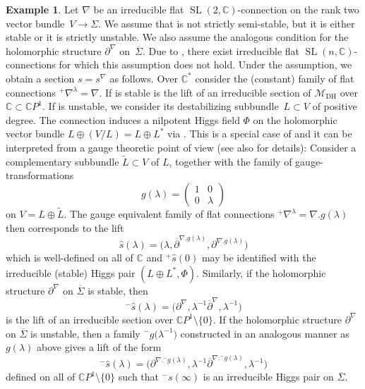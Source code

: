 \documentclass[pdftex]{sigma}
\numberwithin{equation}{section}
\theoremstyle{definition}
\newtheorem{Example}[Theorem]{Example}
\newcommand\C{{\mathbb C}}
\begin{document}
\begin{Example}\label{exm1}
Let $\nabla$ be an irreducible flat $\operatorname{SL}(2,\C)$-connection on the rank two vector bundle~${V
\longrightarrow \Sigma}$.
We assume that \smash{$\overline\partial^\nabla$} is not strictly semi-stable, but it is either stable or
it is strictly
unstable. We also assume the analogous condition for the holomorphic structure
$\partial^\nabla$ on~$\overline\Sigma$. Due to \cite{BDH}, there exist irreducible flat $\operatorname{SL}(n,\C)$-connections for which this assumption does not hold. Under the assumption, we obtain a section
$s = s^\nabla$ as follows. Over $\C^*$ consider the (constant) family of flat connections
$^+\nabla^\lambda = \nabla$.
If \smash{$\overline\partial^\nabla$} is stable
is the lift of an irreducible section of $\mathcal{M}_{\mathrm{DH}}$ over $\C \subset \C P^1$.
If \smash{$\overline\partial^\nabla$} is unstable, we consider its destabilizing subbundle~${L \subset
V}$ of positive degree. The connection
induces a nilpotent Higgs field
$\Phi$ on the holomorphic vector bundle $L\oplus (V/L) = L\oplus L^*$ via
.
This is a special case of \cite{Simpson-iterated} and it can be interpreted from a gauge
theoretic point of view (see also \cite[Section~4]{BeHeRo} for details):
Consider a complementary subbundle $\widetilde{L} \subset V$ of $L$, together with the family of
gauge-transformations
\[g(\lambda) = \begin{pmatrix} 1&0\\0&\lambda \end{pmatrix}\]
on $V = L\oplus \widetilde{L}$.
The gauge equivalent family of flat connections
$^+\nabla^\lambda = \nabla.g(\lambda)$
then corresponds to the lift
\[\widehat s(\lambda) = \bigl( \lambda, \overline\partial^{\nabla.g(\lambda)}, \partial^{\nabla.g(\lambda)}\bigr)\]
which is well-defined on all of $\C$ and $^+\widehat s(0)$ may be identified with the irreducible (stable) Higgs pair
$(L\oplus L^*, \Phi)$. Similarly, if the holomorphic structure $\partial^\nabla$ on $\overline{\Sigma}$ is stable, then
\[^-\widehat{s}(\lambda) = \bigl(\partial^\nabla, \lambda^{-1}\overline{\partial}^\nabla, \lambda^{-1}\bigr)\]
is the lift of an irreducible section over $\C P^1\setminus \{0\}$. If the holomorphic structure $\partial^\nabla$ on $\overline{\Sigma}$ is unstable, then a family $^-g\bigl(\lambda^{-1}\bigr)$ constructed in an analogous manner as $g(\lambda)$ above gives a lift of the form
\[^-\widehat{s}(\lambda) = \bigl(\partial^{\nabla.^-g(\lambda)}, \lambda^{-1}\overline{\partial}^{\nabla.^-g(\lambda)}, \lambda^{-1}\bigr)\]
defined on all of $\C P^1\setminus\{0\}$ such that $^-s(\infty)$ is an irreducible Higgs pair on $\overline{\Sigma}$.
\end{Example}
\end{document}
